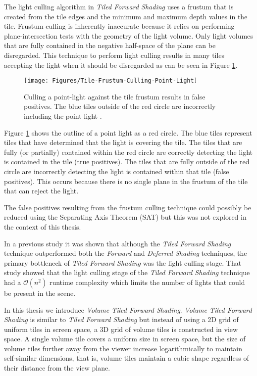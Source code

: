 The light culling algorithm in \emph{Tiled Forward Shading} uses a frustum that is created from the tile edges and the minimum and maximum depth values in the tile. Frustum culling is inherently inaccurate because it relies on performing plane-intersection tests with the geometry of the light volume. Only light volumes that are fully contained in the negative half-space of the plane can be disregarded. This technique to perform light culling results in many tiles accepting the light when it should be disregarded as can be seen in Figure \ref{fig:Tile-Frustum-Culling-Point-Light}.

\begin{figure}[h]
\centering
\texttt{[image: Figures/Tile-Frustum-Culling-Point-Light]}
\decoRule
\caption[Tile-Frustum-Culling-Point-Light]{Culling a point-light against the tile frustum results in false positives. The blue tiles outside of the red circle are incorrectly including the point light \parencite{17_vanoosten_2015}. }
\label{fig:Tile-Frustum-Culling-Point-Light}
\end{figure}

Figure \ref{fig:Tile-Frustum-Culling-Point-Light} shows the outline of a point light as a red circle. The blue tiles represent tiles that have determined that the light is covering the tile. The tiles that are fully (or partially) contained within the red circle are correctly detecting the light is contained in the tile (true positives). The tiles that are fully outside of the red circle are incorrectly detecting the light is contained within that tile (false positives). This occurs because there is no single plane in the frustum of the tile that can reject the light.

The false positives resulting from the frustum culling technique could possibly be reduced using the Separating Axis Theorem (SAT) \parencite{48_dyn4j_2017} but this was not explored in the context of this thesis.

In a previous study \parencite{17_vanoosten_2015} it was shown that although the \emph{Tiled Forward Shading} technique outperformed both the \emph{Forward} and \emph{Deferred Shading} techniques, the primary bottleneck of \emph{Tiled Forward Shading} was the light culling stage. That study showed that the light culling stage of the \emph{Tiled Forward Shading} technique had a $\mathcal{O}(n^2)$ runtime complexity which limits the number of lights that could be present in the scene.

In this thesis we introduce \emph{Volume Tiled Forward Shading}. \emph{Volume Tiled Forward Shading} is similar to \emph{Tiled Forward Shading} but instead of using a 2D grid of uniform tiles in screen space, a 3D grid of volume tiles is constructed in view space. A single volume tile covers a uniform size in screen space, but the size of volume tiles further away from the viewer increase logarithmically to maintain self-similar dimensions, that is, volume tiles maintain a cubic shape regardless of their distance from the view plane.

